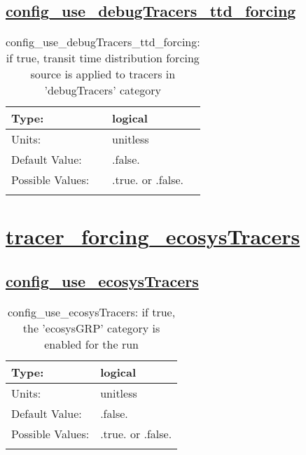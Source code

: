 \subsection[config\_use\_debugTracers\_ttd\_forcing]{\hyperref[sec:nm_tab_tracer_forcing_debugTracers]{config\_use\_debugTracers\_ttd\_forcing}}
\label{subsec:nm_sec_config_use_debugTracers_ttd_forcing}
\begin{center}
\begin{longtable}{| p{2.0in} || p{4.0in} |}
    \hline
    Type: & logical \\
    \hline
    Units: & \si{unitless} \\
    \hline
    Default Value: & .false. \\
    \hline
    Possible Values: & .true. or .false. \\
    \hline
    \caption{config\_use\_debugTracers\_ttd\_forcing: if true, transit time distribution forcing source is applied to tracers in 'debugTracers' category}
\end{longtable}
\end{center}
\section[tracer\_forcing\_ecosysTracers]{\hyperref[sec:nm_tab_tracer_forcing_ecosysTracers]{tracer\_forcing\_ecosysTracers}}
\label{sec:nm_sec_tracer_forcing_ecosysTracers}
\subsection[config\_use\_ecosysTracers]{\hyperref[sec:nm_tab_tracer_forcing_ecosysTracers]{config\_use\_ecosysTracers}}
\label{subsec:nm_sec_config_use_ecosysTracers}
\begin{center}
\begin{longtable}{| p{2.0in} || p{4.0in} |}
    \hline
    Type: & logical \\
    \hline
    Units: & \si{unitless} \\
    \hline
    Default Value: & .false. \\
    \hline
    Possible Values: & .true. or .false. \\
    \hline
    \caption{config\_use\_ecosysTracers: if true, the 'ecosysGRP' category is enabled for the run}
\end{longtable}
\end{center}
